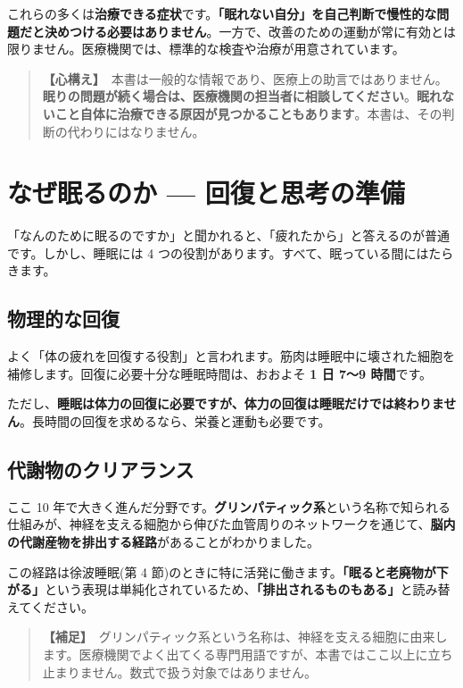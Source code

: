 \documentclass{article}
\begin{document}
これらの多くは\textbf{治療できる症状}です。\textbf{「眠れない自分」を自己判断で慢性的な問題だと決めつける必要はありません}。一方で、改善のための運動が常に有効とは限りません。医療機関では、標準的な検査や治療が用意されています。

\begin{quote}
\textbf{【心構え】}\ 本書は一般的な情報であり、医療上の助言ではありません。\textbf{眠りの問題が続く場合は、医療機関の担当者に相談してください}。\textbf{眠れないこと自体に治療できる原因が見つかることもあります}。本書は、その判断の代わりにはなりません。
\end{quote}

\section{なぜ眠るのか — 回復と思考の準備}

「なんのために眠るのですか」と聞かれると、「疲れたから」と答えるのが普通です。しかし、睡眠には 4 つの役割があります。すべて、眠っている間にはたらきます。

\subsection{物理的な回復}

よく「体の疲れを回復する役割」と言われます。筋肉は睡眠中に壊された細胞を補修します。回復に必要十分な睡眠時間は、おおよそ \textbf{1 日 7〜9 時間}です。

ただし、\textbf{睡眠は体力の回復に必要ですが、体力の回復は睡眠だけでは終わりません}。長時間の回復を求めるなら、栄養と運動も必要です。

\subsection{代謝物のクリアランス}

ここ 10 年で大きく進んだ分野です。\textbf{グリンパティック系}という名称で知られる仕組みが、神経を支える細胞から伸びた血管周りのネットワークを通じて、\textbf{脳内の代謝産物を排出する経路}があることがわかりました。

この経路は徐波睡眠(第 4 節)のときに特に活発に働きます。\textbf{「眠ると老廃物が下がる」}という表現は単純化されているため、\textbf{「排出されるものもある」}と読み替えてください。

\begin{quote}
\textbf{【補足】}\ グリンパティック系という名称は、神経を支える細胞に由来します。医療機関でよく出てくる専門用語ですが、本書ではここ以上に立ち止まりません。数式で扱う対象ではありません。
\end{quote}
\end{document}
